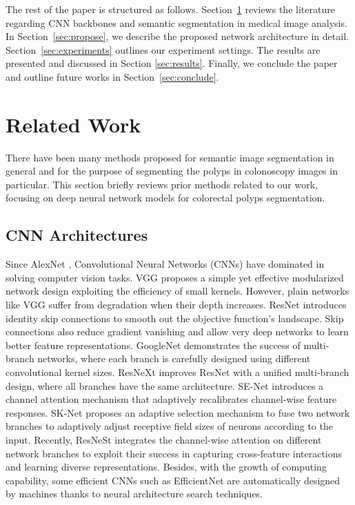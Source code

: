 \documentclass[review, sort&compress]{elsarticle}
\begin{document}
The rest of the paper is structured as follows. Section~\ref{sec:related} reviews the literature regarding CNN backbones and semantic segmentation in medical image analysis. In Section~\ref{sec:propose}, we describe the proposed network architecture in detail. Section~\ref{sec:experiments} outlines our experiment settings. The results are presented and discussed in Section \ref{sec:results}. Finally, we conclude the paper and outline future works in Section~\ref{sec:conclude}.

\section{Related Work}
\label{sec:related}
There have been many methods proposed for semantic image segmentation in general and for the purpose of segmenting the polyps in colonoscopy images in particular. This section briefly reviews prior methods related to our work, focusing on deep neural network models for colorectal polyps segmentation.

\subsection{CNN Architectures}
Since AlexNet \cite{krizhevsky2012imagenet}, Convolutional Neural Networks (CNNs) have dominated in solving computer vision tasks. VGG \cite{simonyan2014very} proposes a simple yet effective modularized network design exploiting the efficiency of small  kernels. However, plain networks like VGG suffer from degradation when their depth increases. ResNet \cite{he2016deep} introduces identity skip connections to smooth out the objective function's landscape. Skip connections also reduce gradient vanishing and allow very deep networks to learn better feature representations. GoogleNet \cite{szegedy2015going} demonstrates the success of multi-branch networks, where each branch is carefully designed using different convolutional kernel sizes. ResNeXt \cite{xie2017aggregated} improves ResNet with a unified multi-branch design, where all branches have the same architecture. SE-Net \cite{hu2018squeeze} introduces a channel attention mechanism that adaptively recalibrates channel-wise feature responses. SK-Net \cite{li2019selective} proposes an adaptive selection mechanism to fuse two network branches to adaptively adjust receptive field sizes of neurons according to the input. Recently, ResNeSt \cite{zhang2020resnest} integrates the channel-wise attention on different network branches to exploit their success in capturing cross-feature interactions and learning diverse representations. Besides, with the growth of computing capability, some efficient CNNs such as EfficientNet \cite{tan2019efficientnet} are automatically designed by machines thanks to neural architecture search techniques.
\end{document}
